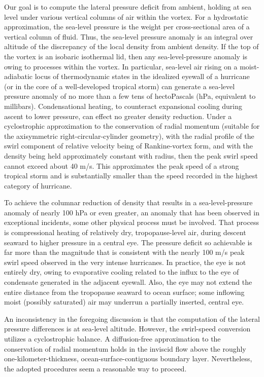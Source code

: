 \documentclass[preprint, prX]{revtex4}
\begin{document}
Our goal is to compute the lateral pressure deficit from ambient, holding at sea level under various vertical columns of air within the vortex. For a hydrostatic approximation, the sea-level pressure is the weight per cross-sectional area of a vertical column of fluid. Thus, the sea-level pressure anomaly is an integral over altitude of the discrepancy of the local density from ambient density. If the top of the vortex is an isobaric isothermal lid, then any sea-level-pressure anomaly is owing to processes within the vortex.
In particular, sea-level air rising on a moist-adiabatic locus of thermodynamic states in the idealized eyewall of a hurricane (or in the core of a well-developed tropical storm) can generate a sea-level pressure anomaly of no more than a few tens of hectoPascals (hPa, equivalent to millibars). Condensational heating, to counteract expansional cooling during ascent to lower pressure, can effect no greater density reduction. Under a cyclostrophic approximation to the conservation of radial momentum (suitable for the axisymmetric right-circular-cylinder geometry), with the radial profile of the swirl component of relative velocity being of Rankine-vortex form, and with the density being held approximately constant with radius, then the peak swirl speed cannot exceed about 40 m/s. This approximates the peak speed of a strong tropical storm and is substantially smaller than the speed recorded in the highest category of hurricane. 

To achieve the columnar reduction of density that results in a sea-level-pressure anomaly of nearly 100 hPa or even greater, an anomaly that has been observed in exceptional incidents, some other physical process must be involved. That process is compressional heating of relatively dry, tropopause-level air, during descent seaward to higher pressure in a central eye.  The pressure deficit so achievable is far more than the magnitude that is consistent with the nearly 100 m/s peak swirl speed observed in the very intense hurricanes. In practice, the eye is not entirely dry, owing to evaporative cooling related to the influx to the eye of condensate generated in the adjacent eyewall. Also, the eye may not extend the entire distance from the tropopause seaward to ocean surface; some inflowing moist (possibly saturated) air may underrun a partially inserted, central eye.

An inconsistency in the foregoing discussion is that the computation of the lateral pressure differences is at sea-level altitude. However, the swirl-speed conversion utilizes a cyclostrophic balance. A diffusion-free approximation to the conservation of radial momentum holds in the inviscid flow above the roughly one-kilometer-thickness, ocean-surface-contiguous boundary layer. Nevertheless, the adopted procedures seem a reasonable way to proceed. 
\end{document}
